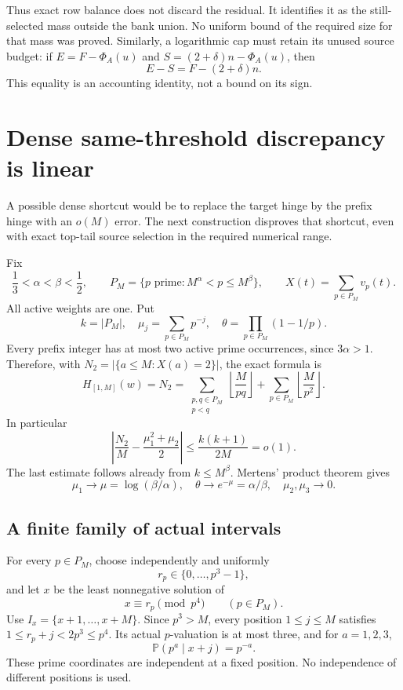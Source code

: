 \documentclass[11pt,a4paper]{article}
\begin{document}
Thus exact row balance does not discard the residual. It identifies
it as the still-selected mass outside the bank union. No uniform
bound of the required size for that mass was proved.
Similarly, a logarithmic cap must retain its unused source budget:
if \(E=F-\Phi_A(u)\) and \(S=(2+\delta)n-\Phi_A(u)\), then
\[
 E-S=F-(2+\delta)n.
 \tag{3}
\]
This equality is an accounting identity, not a bound on its sign.

\section{Dense same-threshold discrepancy is linear}
A possible dense shortcut would be to replace the target hinge by
the prefix hinge with an \(o(M)\) error. The next construction
disproves that shortcut, even with exact top-tail source selection
in the required numerical range.

Fix
\[
 \frac13<\alpha<\beta<\frac12,\qquad
 P_M=\{p\text{ prime}:M^\alpha<p\le M^\beta\},
 \qquad X(t)=\sum_{p\in P_M}v_p(t).
 \tag{4}
\]
All active weights are one. Put
\[
 k=|P_M|,\quad \mu_j=\sum_{p\in P_M}p^{-j},
 \quad \theta=\prod_{p\in P_M}(1-1/p).
 \tag{5}
\]
Every prefix integer has at most two active prime occurrences,
since \(3\alpha>1\). Therefore, with
\(N_2=|\{a\le M:X(a)=2\}|\), the exact formula is
\[
 H_{[1,M]}(w)=N_2
 =\sum_{\substack{p,q\in P_M\\p<q}}\left\lfloor\frac M{pq}\right\rfloor
  +\sum_{p\in P_M}\left\lfloor\frac M{p^2}\right\rfloor.
 \tag{6}
\]
In particular
\[
 \left|\frac{N_2}M-\frac{\mu_1^2+\mu_2}{2}\right|
 \le\frac{k(k+1)}{2M}=o(1).
 \tag{7}
\]
The last estimate follows already from \(k\le M^\beta\).
Mertens' product theorem \cite{Tao} gives
\[
 \mu_1\to\mu=\log(\beta/\alpha),\quad
 \theta\to e^{-\mu}=\alpha/\beta,\quad \mu_2,\mu_3\to0.
 \tag{8}
\]

\subsection*{A finite family of actual intervals}
For every \(p\in P_M\), choose independently and uniformly
\[
 r_p\in\{0,\ldots,p^3-1\},
\]
and let \(x\) be the least nonnegative solution of
\[
 x\equiv r_p\pmod{p^4}\qquad(p\in P_M).
 \tag{9}
\]
Use \(I_x=\{x+1,\ldots,x+M\}\). Since \(p^3>M\), every position
\(1\le j\le M\) satisfies \(1\le r_p+j<2p^3\le p^4\).
Its actual \(p\)-valuation is at most three, and for \(a=1,2,3\),
\[
 \mathbb P(p^a\mid x+j)=p^{-a}.
 \tag{10}
\]
These prime coordinates are independent at a fixed position.
No independence of different positions is used.
\end{document}
